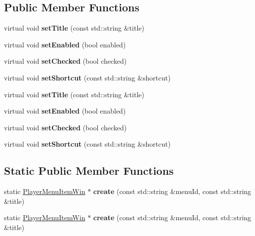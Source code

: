 \subsection*{Public Member Functions}
\begin{DoxyCompactItemize}
\item 
\mbox{\label{classPlayerMenuItemWin_a719bf9ca5d096c442a89211b6db27cfe}} 
virtual void {\bfseries set\+Title} (const std\+::string \&title)
\item 
\mbox{\label{classPlayerMenuItemWin_ae7bdda4c6843bb0d824c9b68968f7714}} 
virtual void {\bfseries set\+Enabled} (bool enabled)
\item 
\mbox{\label{classPlayerMenuItemWin_a6e958235bfbd526ef6f0764ade85d668}} 
virtual void {\bfseries set\+Checked} (bool checked)
\item 
\mbox{\label{classPlayerMenuItemWin_a2eb68a0c2576b4b3b9ba4cf1345b20fe}} 
virtual void {\bfseries set\+Shortcut} (const std\+::string \&shortcut)
\item 
\mbox{\label{classPlayerMenuItemWin_a336fac494e1d7ce556364fa90c16f668}} 
virtual void {\bfseries set\+Title} (const std\+::string \&title)
\item 
\mbox{\label{classPlayerMenuItemWin_ad0ed4cbc6d0949b61691456e250db067}} 
virtual void {\bfseries set\+Enabled} (bool enabled)
\item 
\mbox{\label{classPlayerMenuItemWin_a43324e6aaa466111d746b94c814c8e11}} 
virtual void {\bfseries set\+Checked} (bool checked)
\item 
\mbox{\label{classPlayerMenuItemWin_ad7707ae7606aecc120f7aaa1cab31186}} 
virtual void {\bfseries set\+Shortcut} (const std\+::string \&shortcut)
\end{DoxyCompactItemize}
\subsection*{Static Public Member Functions}
\begin{DoxyCompactItemize}
\item 
\mbox{\label{classPlayerMenuItemWin_a48c6c4c765c864112de3f5f59711c997}} 
static \hyperlink{classPlayerMenuItemWin}{Player\+Menu\+Item\+Win} $\ast$ {\bfseries create} (const std\+::string \&menu\+Id, const std\+::string \&title)
\item 
\mbox{\label{classPlayerMenuItemWin_af48e07e82217bf05dba857d1e5679c38}} 
static \hyperlink{classPlayerMenuItemWin}{Player\+Menu\+Item\+Win} $\ast$ {\bfseries create} (const std\+::string \&menu\+Id, const std\+::string \&title)
\end{DoxyCompactItemize}

